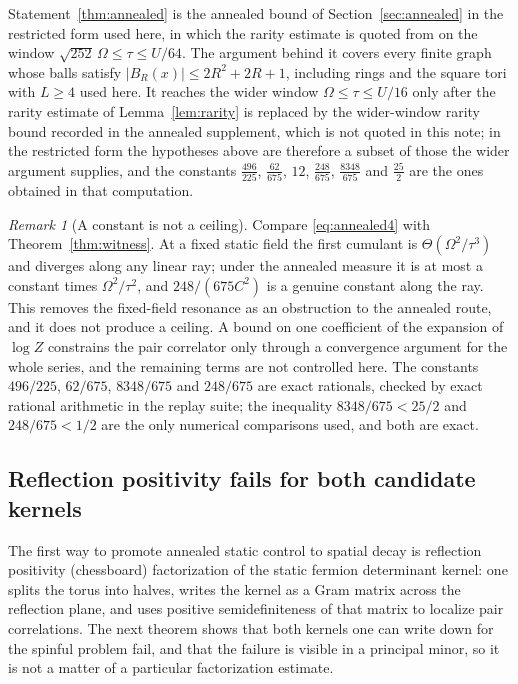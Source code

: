 \documentclass[11pt]{article}
\theoremstyle{definition}
\theoremstyle{remark}
\newtheorem{remark}[theorem]{Remark}
\begin{document}
Statement~\ref{thm:annealed} is the annealed bound of Section~\ref{sec:annealed} in
the restricted form used here, in which the rarity estimate is quoted from
\cite{limits} on the window $\sqrt{252}\,\Omega\le\tau\le U/64$. The argument
behind it covers every finite graph whose balls satisfy $|B_R(x)|\le2R^2+2R+1$,
including rings and the square tori with $L\ge4$ used here. It reaches the wider
window $\Omega\le\tau\le U/16$ only after the rarity estimate of
Lemma~\ref{lem:rarity} is replaced by the wider-window rarity bound recorded in the
annealed supplement, which is not quoted in this note; in the restricted form the
hypotheses above are therefore a subset of those the wider argument supplies, and the
constants $\frac{496}{225}$, $\frac{62}{675}$, $12$, $\frac{248}{675}$,
$\frac{8348}{675}$ and $\frac{25}{2}$ are the ones obtained in that computation.

\begin{remark}[A constant is not a ceiling]
\label{rem:nottceil}
Compare \eqref{eq:annealed4} with Theorem~\ref{thm:witness}. At a fixed static field
the first cumulant is $\Theta(\Omega^2/\tau^3)$ and diverges along any linear ray;
under the annealed measure it is at most a constant times $\Omega^2/\tau^2$, and
$248/(675C^2)$ is a genuine constant along the ray. This removes the fixed-field
resonance as an obstruction to the annealed route, and it does not produce a ceiling.
A bound on one coefficient of the expansion of $\log Z$ constrains the pair
correlator only through a convergence argument for the whole series, and the
remaining terms are not controlled here. The constants $496/225$, $62/675$,
$8348/675$ and $248/675$ are exact rationals, checked by exact rational arithmetic in
the replay suite; the inequality $8348/675<25/2$ and $248/675<1/2$ are the only
numerical comparisons used, and both are exact.
\end{remark}

\subsection{Reflection positivity fails for both candidate kernels}

The first way to promote annealed static control to spatial decay is reflection
positivity (chessboard) factorization of the static fermion determinant kernel: one
splits the torus into halves, writes the kernel as a Gram matrix across the
reflection plane, and uses positive semidefiniteness of that matrix to localize pair
correlations. The next theorem shows that both kernels one can write down for the
spinful problem fail, and that the failure is visible in a principal minor, so it is
not a matter of a particular factorization estimate.
\end{document}
